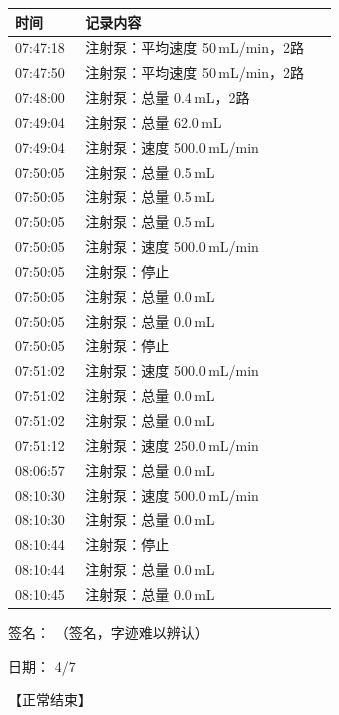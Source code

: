 \documentclass[UTF8,10pt,a4paper,fontset=fandol]{ctexart}
\newcommand{\fieldvalue}[1]{#1}
\newcommand{\handwritten}[1]{#1}
\begin{document}
\vspace{1em}

\noindent
\begin{tabular}{p{0.20\linewidth}p{0.72\linewidth}}
\textbf{时间} & \textbf{记录内容}\\ \hline
07:47:18 & 注射泵：平均速度 50\,mL/min，2路\\
07:47:50 & 注射泵：平均速度 50\,mL/min，2路\\
07:48:00 & 注射泵：总量 0.4\,mL，2路\\
07:49:04 & 注射泵：总量 62.0\,mL\\
07:49:04 & 注射泵：速度 500.0\,mL/min\\
07:50:05 & 注射泵：总量 0.5\,mL\\
07:50:05 & 注射泵：总量 0.5\,mL\\
07:50:05 & 注射泵：总量 0.5\,mL\\
07:50:05 & 注射泵：速度 500.0\,mL/min\\
07:50:05 & 注射泵：停止\\
07:50:05 & 注射泵：总量 0.0\,mL\\
07:50:05 & 注射泵：总量 0.0\,mL\\
07:50:05 & 注射泵：停止\\
07:51:02 & 注射泵：速度 500.0\,mL/min\\
07:51:02 & 注射泵：总量 0.0\,mL\\
07:51:02 & 注射泵：总量 0.0\,mL\\
07:51:12 & 注射泵：速度 250.0\,mL/min\\
08:06:57 & 注射泵：总量 0.0\,mL\\
08:10:30 & 注射泵：速度 500.0\,mL/min\\
08:10:30 & 注射泵：总量 0.0\,mL\\
08:10:44 & 注射泵：停止\\
08:10:44 & 注射泵：总量 0.0\,mL\\
08:10:45 & 注射泵：总量 0.0\,mL\\
\end{tabular}

\vfill

\noindent
签名：
\fieldvalue{\handwritten{（签名，字迹难以辨认）}}

\hspace{2em}日期：
\fieldvalue{\handwritten{4/7}}

\noindent
【正常结束】
\end{document}

